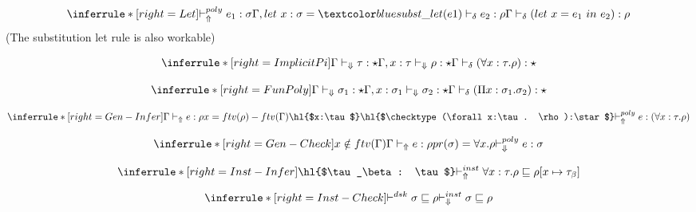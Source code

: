 \[
\inferrule*[right=Let]
{\polyinfer e_1 : \sigma \\ \Gamma, let\ x:\sigma = \substlet(e1) \infercheckno e_2: \rho}
{\infercheck ( let\ x = e_1\ in\ e_2 ) : \rho }
\]
(The substitution let rule is also workable)

\framebox{$ \judge \sigma : \star$ }

\[
\inferrule*[right=ImplicitPi]
{\checktype \tau : \star \\ \Gamma, x:\tau \checktypeno \rho : \star} {\infercheck (\forall x : \tau. \rho) : \star}
\]

\framebox{$ \judge \rho : \star$ }

\[
\inferrule*[right=FunPoly]
{\checktype \sigma_1 : \star \\ \Gamma, x:\sigma_1 \checktypeno \sigma_2 : \star} {\infercheck (\Pi x : \sigma_1. \sigma_2) : \star}
\]

\framebox{$ \Gamma \polyinfercheck \tau : \sigma$ }

\[
\inferrule*[right=Gen-Infer]
{\infertype e :\rho \\ x=ftv(\rho)-ftv(\Gamma) \\
\hl{$x:\tau$} \\
\hl{$\checktype (\forall x:\tau. \rho):\star$} } {\polyinfer e :(\forall x:\tau. \rho)}
\]

\[
\inferrule*[right=Gen-Check]
{x \notin ftv(\Gamma) \\ \infertype e :\rho \\ pr(\sigma) = \forall x. \rho} {\polycheck e : \sigma}
\]

\framebox{$ \instinfercheck \sigma \sqsubseteq \rho$ }

\[
\inferrule*[right=Inst-Infer]
{\hl{$\tau_\beta : \tau$}}
{\instinfer \forall x:\tau. \rho \sqsubseteq \rho[x \mapsto \tau_\beta]}
\]

\[
\inferrule*[right=Inst-Check]
{\polymorphic \sigma \sqsubseteq \rho } {\instcheck \sigma \sqsubseteq \rho}
\]





